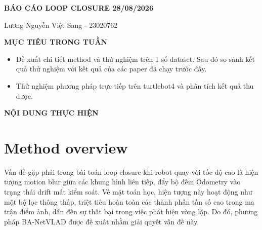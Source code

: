 \documentclass[a4paper,12pt]{article}
\begin{document}
\begin{center}
\textbf{\LARGE {BÁO CÁO LOOP CLOSURE 28/08/2026}} \\
\end{center}

\vspace{0.3cm}

\begin{flushleft}
    \hspace*{2.7cm} {\Large Lương Nguyễn Việt Sang - 23020762}\\[0.5em]
\end{flushleft}

\vspace{0.3cm}
\Large

\textbf{MỤC TIÊU TRONG TUẦN} 
\begin{itemize}
    \item Đề xuất chi tiết method và thử nghiệm trên 1 số dataset. Sau đó so sánh kết quả thử nghiệm với kết quả của các paper đã chạy trước đấy.
    \item Thử nghiệm phương pháp trực tiếp trên turtlebot4 và phân tích kết quả thu được.
\end{itemize}

\textbf{NỘI DUNG THỰC HIỆN}
\section{Method overview}
Vấn đề gặp phải trong bài toán loop closure khi robot quay với tốc độ cao là hiện tượng motion blur giữa các khung hình liên tiếp, đẩy bộ đếm Odometry vào trạng thái drift mất kiểm soát. Về mặt toán học, hiện tượng này hoạt động như một bộ lọc thông thấp, triệt tiêu hoàn toàn các thành phần tần số cao trong ma trận điểm ảnh, dẫn đến sự thất bại trong việc phát hiện vòng lặp. Do đó, phương pháp BA-NetVLAD được đề xuất nhằm giải quyết vấn đề này. \\
\end{document}
